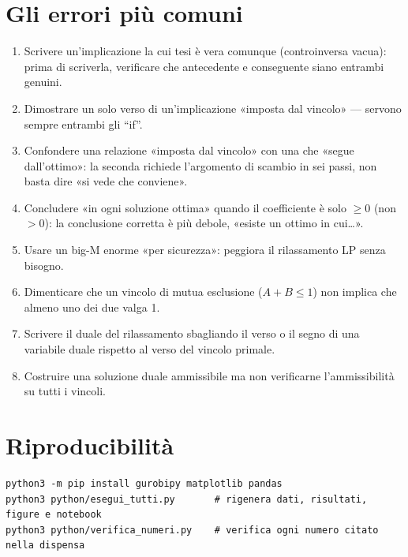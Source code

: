 \section{Gli errori più comuni}
\begin{enumerate}
\item Scrivere un'implicazione la cui tesi è vera comunque (controinversa
      vacua): prima di scriverla, verificare che antecedente e conseguente
      siano entrambi genuini.
\item Dimostrare un solo verso di un'implicazione «imposta dal vincolo» ---
      servono sempre entrambi gli ``if''.
\item Confondere una relazione «imposta dal vincolo» con una che «segue
      dall'ottimo»: la seconda richiede l'argomento di scambio in sei passi,
      non basta dire «si vede che conviene».
\item Concludere «in ogni soluzione ottima» quando il coefficiente è solo
      $\ge 0$ (non $>0$): la conclusione corretta è più debole, «esiste un
      ottimo in cui\ldots».
\item Usare un big-M enorme «per sicurezza»: peggiora il rilassamento LP
      senza bisogno.
\item Dimenticare che un vincolo di mutua esclusione ($A+B\le 1$) non implica
      che almeno uno dei due valga 1.
\item Scrivere il duale del rilassamento sbagliando il verso o il segno di
      una variabile duale rispetto al verso del vincolo primale.
\item Costruire una soluzione duale ammissibile ma non verificarne
      l'ammissibilità su tutti i vincoli.
\end{enumerate}

\section{Riproducibilità}
\begin{lstlisting}[style=output]
python3 -m pip install gurobipy matplotlib pandas
python3 python/esegui_tutti.py       # rigenera dati, risultati, figure e notebook
python3 python/verifica_numeri.py    # verifica ogni numero citato nella dispensa
\end{lstlisting}
